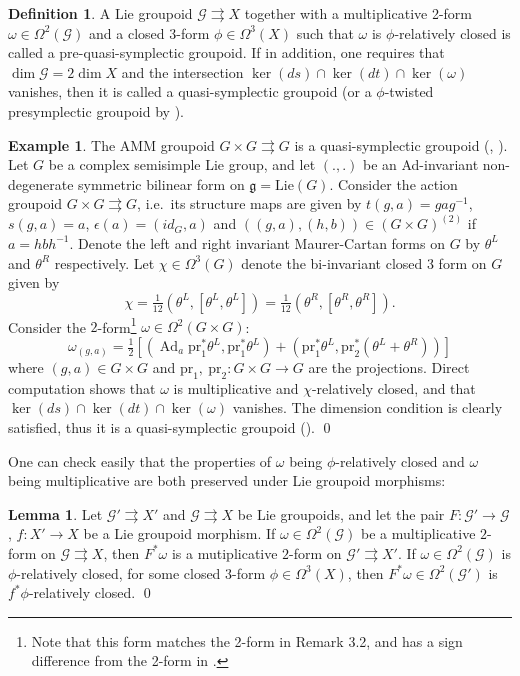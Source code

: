 \documentclass[a4paper,12pt,leqno]{amsart}
\numberwithin{equation}{section}
\theoremstyle{plain}
\theoremstyle{definition}
\DeclareMathOperator{\Ad}{Ad}
\newcommand{\cG}{\mathcal{G}}
\newcommand{\fg}{\mathfrak{g}}
\newcommand{\pr}{\mathrm{pr}}
\newcommand{\Lie}{\mathrm{Lie}}
\newtheorem{lm}[thm]{Lemma}
\newtheorem{ex}[thm]{Example}
\newtheorem{df}[thm]{Definition}
\begin{document}
\begin{df} \cite{Xu04}
A Lie groupoid $\cG\rightrightarrows X$ together with a multiplicative 2-form $\omega\in \Omega^2(\cG)$ and a closed 3-form $\phi\in \Omega^3(X)$ such that $\omega$ is $\phi$-relatively closed is called a pre-quasi-symplectic groupoid. If in addition, one requires that $\dim\cG=2\dim X$ and the intersection $\ker(ds)\cap\ker(dt)\cap\ker(\omega)$ vanishes, then it is called a quasi-symplectic groupoid (or a $\phi$-twisted presymplectic groupoid by \cite{BCWZ}).
\end{df}

\begin{ex} The AMM groupoid $G\times G\rightrightarrows G$ is a quasi-symplectic groupoid (\cite{AMM}, \cite{Xu04}). 
Let $G$ be a complex semisimple Lie group, and let $(.,.)$ be an Ad-invariant non-degenerate symmetric bilinear form on $\fg=\Lie(G)$.
Consider the action groupoid $G\times G\rightrightarrows G$, i.e.\ its structure maps are given by $t(g,a)=gag^{-1}$, $s(g,a)=a$, $\epsilon(a)=(id_G,a)$ and $( (g,a), (h,b) )\in (G\times G)^{(2)}$ if $a=hbh^{-1}$.
Denote the left and right invariant Maurer-Cartan forms on $G$ by $\theta^L$ and $\theta^R$ respectively.
Let $\chi\in \Omega^3(G)$ denote the bi-invariant closed 3 form on $G$ given by
\[\chi=\tfrac{1}{12}(\theta^L,[\theta^L,\theta^L])=\tfrac{1}{12}(\theta^R,[\theta^R,\theta^R]). \]
Consider the $2$-form\footnote{Note that this form matches the 2-form in \cite{AMM} Remark 3.2, and has a sign difference from the 2-form in \cite{Xu04}.} $\omega\in\Omega^2(G\times G)$:
\begin{equation}\label{eq:quasi2form}
\omega_{(g,a)}=\tfrac{1}{2}[(\Ad_a\pr_1^*\theta^L,\pr_1^*\theta^L)+(\pr_1^*\theta^L,\pr^*_2(\theta^L+\theta^R))]
\end{equation}
where $(g,a)\in G\times G$ and $\pr_1,~ \pr_2:G\times G \to G$ are the projections. Direct computation shows that $\omega$ is multiplicative and $\chi$-relatively closed, and that $\ker(ds)\cap\ker(dt)\cap\ker(\omega)$ vanishes. The dimension condition is clearly satisfied, thus it is a quasi-symplectic groupoid (\cite{Xu04}).
\qed
\end{ex}

One can check easily that the properties of $\omega$ being $\phi$-relatively closed and $\omega$ being multiplicative are both preserved under Lie groupoid morphisms:

\begin{lm}\label{lm:multiplicative}
Let $\cG'\rightrightarrows X'$ and $\cG \rightrightarrows X$ be Lie groupoids, and let the pair $F:\cG'\to\cG$, $f:X'\to X$ be a Lie groupoid morphism. If $\omega\in\Omega^2(\cG)$ be a multiplicative $2$-form on $\cG\rightrightarrows X$, then $F^*\omega$ is a mutiplicative $2$-form on $\cG'\rightrightarrows X'$. If $\omega\in \Omega^2(\cG)$ is $\phi$-relatively closed, for some closed $3$-form $\phi\in\Omega^3(X)$, then $F^*\omega\in\Omega^2(\cG')$ is $f^*\phi$-relatively closed.
\qed
\end{lm}
\end{document}
